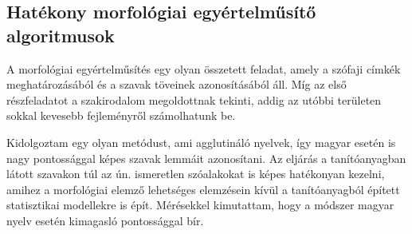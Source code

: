 \let\oldthesubsection=\thesubsection
\renewcommand{\thesubsection}{\Roman{subsection}}



\subsection{Hatékony morfológiai egyértelműsítő algoritmusok}
\label{thes:morf}

A morfológiai egyértelműsítés egy olyan összetett feladat, amely a szófaji címkék meghatározásából és a szavak töveinek azonosításából áll. 
Míg az első részfeladatot a szakirodalom megoldottnak tekinti, addig az utóbbi területen sokkal kevesebb fejleményről számolhatunk be. 

\begin{core}
\begin{thesis}\label{thes:morf-lemma}
Kidolgoztam egy olyan metódust, ami agglutináló nyelvek, így magyar esetén is nagy pontossággal képes szavak lemmáit azonosítani. 
Az eljárás a tanítóanyagban látott szavakon túl az ún. ismeretlen szóalakokat is képes hatékonyan kezelni, amihez a morfológiai elemző lehetséges elemzésein kívül a tanítóanyagból épített statisztikai modellekre is épít. 
Mérésekkel kimutattam, hogy a módszer magyar nyelv esetén kimagasló pontossággal bír. 
\end{thesis} 

\begin{pub}
\cite{Orosz2011,Orosz2012,Orosz2012a,Orosz2013a}
\end{pub}
\end{core}

